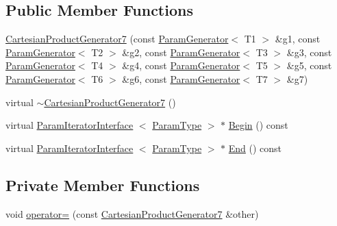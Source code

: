 \subsection*{\-Public \-Member \-Functions}
\begin{DoxyCompactItemize}
\item 
\hyperlink{classtesting_1_1internal_1_1CartesianProductGenerator7_ac0bb3ed1cec4492cd7ad0ba085d2f7e4}{\-Cartesian\-Product\-Generator7} (const \hyperlink{classtesting_1_1internal_1_1ParamGenerator}{\-Param\-Generator}$<$ \-T1 $>$ \&g1, const \hyperlink{classtesting_1_1internal_1_1ParamGenerator}{\-Param\-Generator}$<$ \-T2 $>$ \&g2, const \hyperlink{classtesting_1_1internal_1_1ParamGenerator}{\-Param\-Generator}$<$ \-T3 $>$ \&g3, const \hyperlink{classtesting_1_1internal_1_1ParamGenerator}{\-Param\-Generator}$<$ \-T4 $>$ \&g4, const \hyperlink{classtesting_1_1internal_1_1ParamGenerator}{\-Param\-Generator}$<$ \-T5 $>$ \&g5, const \hyperlink{classtesting_1_1internal_1_1ParamGenerator}{\-Param\-Generator}$<$ \-T6 $>$ \&g6, const \hyperlink{classtesting_1_1internal_1_1ParamGenerator}{\-Param\-Generator}$<$ \-T7 $>$ \&g7)
\item 
virtual \hyperlink{classtesting_1_1internal_1_1CartesianProductGenerator7_a457f674b3d00b724d2b2940db66ee8e8}{$\sim$\-Cartesian\-Product\-Generator7} ()
\item 
virtual \hyperlink{classtesting_1_1internal_1_1ParamIteratorInterface}{\-Param\-Iterator\-Interface}\*
$<$ \hyperlink{classtesting_1_1internal_1_1CartesianProductGenerator7_a18469e04d44a379d754ff5044f09531f}{\-Param\-Type} $>$ $\ast$ \hyperlink{classtesting_1_1internal_1_1CartesianProductGenerator7_ab6a1e6ee0c9095fec4ca7dd2fe9736cd}{\-Begin} () const 
\item 
virtual \hyperlink{classtesting_1_1internal_1_1ParamIteratorInterface}{\-Param\-Iterator\-Interface}\*
$<$ \hyperlink{classtesting_1_1internal_1_1CartesianProductGenerator7_a18469e04d44a379d754ff5044f09531f}{\-Param\-Type} $>$ $\ast$ \hyperlink{classtesting_1_1internal_1_1CartesianProductGenerator7_a2175654afa23856e885489861c353c72}{\-End} () const 
\end{DoxyCompactItemize}
\subsection*{\-Private \-Member \-Functions}
\begin{DoxyCompactItemize}
\item 
void \hyperlink{classtesting_1_1internal_1_1CartesianProductGenerator7_a27b95f73ac401030591c0bb92450278d}{operator=} (const \hyperlink{classtesting_1_1internal_1_1CartesianProductGenerator7}{\-Cartesian\-Product\-Generator7} \&other)
\end{DoxyCompactItemize}
